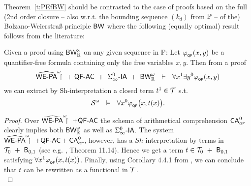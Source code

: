 Theorem~\ref{t:PEfBW} should be contrasted to the case of 
proofs based on the full (2nd order closure -- also w.r.t. the 
bounding sequence $(k_d)$ from $\mathbb{P}$ -- of the) 
Bolzano-Weierstra\ss{} principle 
$\textsf{\upshape BW}$ where the following (equally optimal) result follows from 
the literature: 
\begin{thm} 
\label{t:PEBW}
Given a proof 
using $\textsf{\upshape BW}^\omega_{\mathbb{R}}$ on any given sequence in $\mathbb{P}$: Let $\varphi_{_{\textsf{\upshape QF}}}(x,y)$ be 
a quantifier-free formula containing only the free variables $x,y.$ Then 
from a proof 
\[
\hrrwepa\ +\ \QFm\AC\ +\ \Sigma^0_\infty\usftext{-IA}\ +\ \BW^\omega_\RR\ \ 
\vdash\ \ 
    \forall x^1\exists y^0 \phi_{_\QF}(x,y)
\]
we can extract by Sh-interpretation a closed term $t^1\in\mathcal{T}$ s.t.
\[
\mathcal{S} ^\omega\ \ \vDash\ \ \forall x^0 \varphi_{_{\textsf{\upshape QF}}}\big(x,t(x)\big) \text{.}
\]
\end{thm} 
\begin{proof}
Over $\widehat{\textsf{\upshape WE-PA}}^\omega\!\!\!\restriction\ + \textsf{\upshape QF-}\textsf{\upshape AC}$ the schema of arithmetical comprehension 
$\textsf{\upshape CA}^0_{ar}$ clearly implies both $\textsf{\upshape BW}^\omega_{\mathbb{R}}$ as well as 
$\Sigma^0_{\infty}\textsf{\upshape -IA}.$ The system 
$\widehat{\textsf{\upshape WE-PA}}^\omega\!\!\!\restriction\ + \textsf{\upshape QF-}\textsf{\upshape AC} +\textsf{\upshape CA}^0_{ar}$, however, has a $Sh$-interpretation by terms 
in  $\mathcal{T}_0\ +\ \textsf{\upshape B}_{0,1}$ (see e.g. \cite{Kohlenbach08}, Theorem 11.14).
Hence we get a term $t\in \T_0\ +\ \B_{0,1}$ satisfying
 $\forall x^1\varphi_{_{\textsf{\upshape QF}}}(x,t(x))$. Finally, using Corollary 4.4.1 
from \cite{Kohlenbach99}, 
we can conclude that $t$ can be
rewritten as a functional in $\mathcal{T}$.\\
\end{proof}

